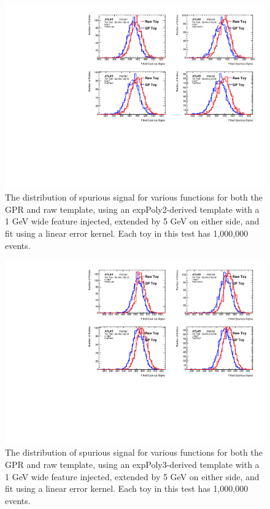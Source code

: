 \begin{figure} 
\begin{center}
  \includegraphics[width=\textwidth]{figures/background/gpr/validation/linear/ToyTest_FitSigVals_lowpT_1M_Sig_1s}   
\caption{The distribution of spurious signal for various functions for both the GPR and raw template, using an expPoly2-derived template with a 1 GeV wide feature injected, extended by 5 GeV on either side, and fit using a linear error kernel. Each toy in this test has 1,000,000 events.}
\label{fig:linearkernel_lowpt_1M_Sig_1s}
\end{center}
\end{figure}

\begin{figure} 
\begin{center}
  \includegraphics[width=\textwidth]{figures/background/gpr/validation/linear/ToyTest_FitSigVals_medpT_1M_Sig_1s}   
\caption{The distribution of spurious signal for various functions for both the GPR and raw template, using an expPoly3-derived template with a 1 GeV wide feature injected, extended by 5 GeV on either side, and fit using a linear error kernel. Each toy in this test has 1,000,000 events.}
\label{fig:linearkernel_medpt_1M_Sig_1s}
\end{center}
\end{figure}

